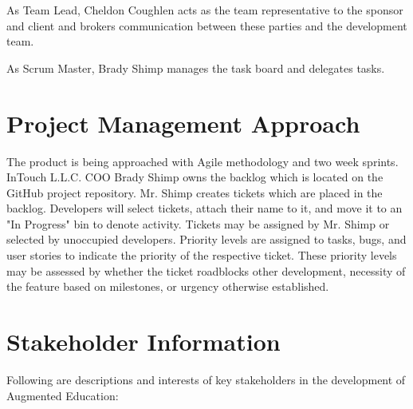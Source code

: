 As Team Lead, Cheldon Coughlen acts as the team representative to the sponsor and client and brokers communication between these parties and the development team. 

As Scrum Master, Brady Shimp manages the task board and delegates tasks. 

\section{Project  Management Approach}

The product is being approached with Agile methodology and two week sprints. InTouch L.L.C. COO Brady Shimp owns the backlog which is located on the GitHub project repository. Mr. Shimp creates tickets which are placed in the backlog. Developers will select tickets, attach their name to it, and move it to an "In Progress" bin to denote activity. Tickets may be assigned by Mr. Shimp or selected by unoccupied developers. Priority levels are assigned to tasks, bugs, and user stories to indicate the priority of the respective ticket. These priority levels may be assessed by whether the ticket roadblocks other development, necessity of the feature based on milestones, or urgency otherwise established.

\section{ Stakeholder Information}



Following are descriptions and interests of key stakeholders in the development of Augmented Education:

